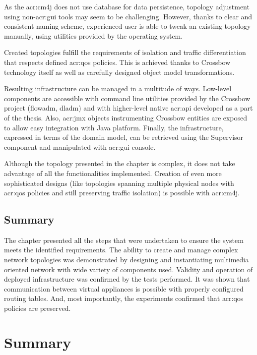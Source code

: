 \documentclass[11pt]{book}
\begin{document}
      As the \gls{acr:cm4j} does not use database for data persistence, topology adjustment using non-\gls{acr:gui}
      tools may seem to be challenging. However, thanks to clear and consistent naming scheme, experienced user is able
      to tweak an existing topology manually, using utilities provided by the operating system.

      Created topologies fulfill the requirements of isolation and traffic differentiation that respects defined
      \gls{acr:qos} policies. This is achieved thanks to Crossbow technology itself as well as carefully designed object
      model transformations.

      Resulting infrastructure can be managed in a multitude of ways. Low-level components are accessible with command
      line utilities provided by the Crossbow project (flowadm, dladm) and with higher-level native \gls{acr:api}
      developed as a part of the thesis. Also, \gls{acr:jmx} objects instrumenting Crossbow entities are exposed to
      allow easy integration with Java platform. Finally, the infrastructure, expressed in terms of the domain model,
      can be retrieved using the Supervisor component and manipulated with \gls{acr:gui} console.

      Although the topology presented in the chapter is complex, it does not take advantage of all the functionalities
      implemented. Creation of even more sophisticated designs (like topologies spanning multiple physical nodes with
      \gls{acr:qos} policies and still preserving traffic isolation) is possible with \gls{acr:cm4j}.


    \section*{Summary}

      The chapter presented all the steps that were undertaken to ensure the system meets the identified requirements.
      The ability to create and manage complex network topologies was demonstrated by designing and instantiating
      multimedia oriented network with wide variety of components used. Validity and operation of deployed
      infrastructure was confirmed by the tests performed. It was shown that communication between virtual appliances is
      possible with properly configured routing tables. And, most importantly, the experiments confirmed that
      \gls{acr:qos} policies are preserved.


  \chapter{Summary}
  \label{chap:sum}
\end{document}
